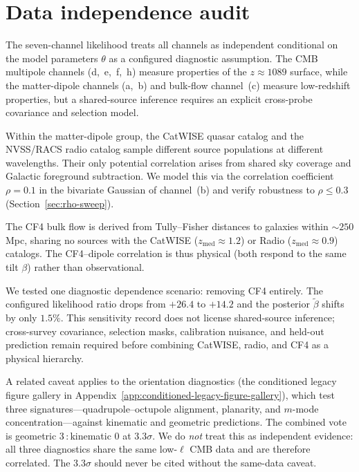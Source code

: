 \section{Data independence audit}\label{sec:data-independence}

The seven-channel likelihood treats all channels as
independent conditional on the model parameters $\theta$ as a
configured diagnostic assumption.  The CMB multipole channels
(d,~e,~f,~h) measure properties of the $z \approx 1089$
surface, while the matter-dipole channels (a,~b) and bulk-flow
channel~(c) measure low-redshift properties, but a shared-source
inference requires an explicit cross-probe covariance and
selection model.

Within the matter-dipole group, the CatWISE quasar catalog
and the NVSS/RACS radio catalog sample different source
populations at different wavelengths.  Their only potential
correlation arises from shared sky coverage and Galactic
foreground subtraction.  We model this via the correlation
coefficient $\rho = 0.1$ in the bivariate Gaussian of
channel~(b) and verify robustness to $\rho \leq 0.3$
(Section~\ref{sec:rho-sweep}).

The CF4 bulk flow is derived from Tully--Fisher distances to
galaxies within $\sim 250$ Mpc, sharing no sources with the
CatWISE ($z_{\mathrm{med}} \approx 1.2$) or Radio
($z_{\mathrm{med}} \approx 0.9$) catalogs.  The CF4--dipole
correlation is thus physical (both respond to the same
tilt $\beta$) rather than observational.

We tested one diagnostic dependence scenario: removing CF4
entirely.  The configured likelihood ratio drops from $+26.4$
to $+14.2$ and the posterior $\tilde{\beta}$ shifts by only
$1.5\%$.  This sensitivity record does not license shared-source
inference; cross-survey covariance, selection masks, calibration
nuisance, and held-out prediction remain required before
combining CatWISE, radio, and CF4 as a physical hierarchy.

A related caveat applies to the orientation diagnostics
(the conditioned legacy figure gallery in Appendix~\ref{app:conditioned-legacy-figure-gallery}), which test three
signatures---quadrupole--octupole alignment, planarity, and
$m$-mode concentration---against kinematic and geometric
predictions.  The combined vote is geometric 3\,:\,kinematic 0 at
$3.3\sigma$.  We do \emph{not} treat this as independent evidence:
all three diagnostics share the same low-$\ell$ CMB data and are
therefore correlated.  The $3.3\sigma$ should never be cited
without the same-data caveat.
\label{sec:orientation_caveat}


